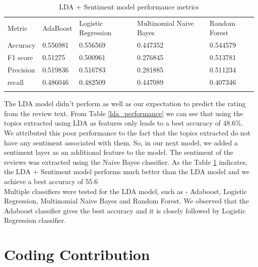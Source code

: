 \documentclass[paper=a4, fontsize=11pt]{scrartcl} %
\numberwithin{equation}{section} %
\numberwithin{figure}{section} %
\numberwithin{table}{section} %
\begin{document}
\begin{table}[!htb]
 \centering
 \caption{LDA + Sentiment model performance metrics}
 \label{lda_sentiment_performance}
 \begin{tabular}{l l l l l} 
    \noalign{\smallskip}\hline\noalign{\smallskip}
    Metric & AdaBoost & Logistic Regression & \multicolumn{1}{p{3cm}}{Multinomial Naive Bayes}& Random Forest\\
    \noalign{\smallskip}\hline\noalign{\smallskip}
    Accuracy & 0.556981	&0.556569	&0.447352	&0.544579\\
    F1 score & 0.51275 &0.500961	&0.276845	&0.513781\\
    Precision & 0.519836 &0.516783	&0.281885 &0.511234\\
    recall & 0.486046	&0.482509	&0.447089	&0.407346\\
    \noalign{\smallskip}\hline
  \end{tabular} 
\end{table}  

The LDA model didn't perform as well as our expectation to predict the rating from the review text. From Table \ref{lda_performance} we can see that using the topics extracted using LDA as features only leads to a best accuracy of 48.6\%. We attributed this poor performance to the fact that the topics extracted do not have any sentiment associated with them. So, in our next model, we added a sentiment layer as an additional feature to the model. The sentiment of the reviews was extracted using the Naive Bayes classifier. As the Table \ref{lda_sentiment_performance} indicates, the LDA + Sentiment model performs much better than the LDA model and we achieve a best accuracy of 55.6%
\\

Multiple classifiers were tested for the LDA model, such as - Adaboost, Logistic Regression, Multinomial Naive Bayes and Random Forest. We observed that the Adaboost classifier gives the best accuracy and it is closely followed by Logistic Regression classifier.

\section{Coding Contribution}
\end{document}
